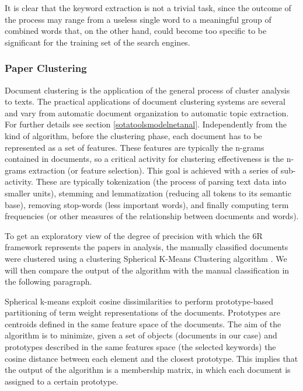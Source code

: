 \documentclass[]{book}
\begin{document}
It is clear that the keyword extraction is not a trivial task, since the
outcome of the process may range from a useless single word to a
meaningful group of combined words that, on the other hand, could become
too specific to be significant for the training set of the search
engines.

\subsubsection*{Paper Clustering}\label{paper-clustering}

Document clustering is the application of the general process of cluster
analysis to texts. The practical applications of document clustering
systems are several and vary from automatic document organization to
automatic topic extraction. For further details see section
\ref{sotatoolsmodelnetanal}. Independently from the kind of algorithm,
before the clustering phase, each document has to be represented as a
set of features. These features are typically the n-grams contained in
documents, so a critical activity for clustering effectiveness is the
n-grams extraction (or feature selection). This goal is achieved with a
series of sub-activity. These are typically tokenization (the process of
parsing text data into smaller units), stemming and lemmatization
(reducing all tokens to its semantic base), removing stop-words (less
important words), and finally computing term frequencies (or other
measures of the relationship between documents and words).

To get an exploratory view of the degree of precision with which the 6R
framework represents the papers in analysis, the manually classified
documents were clustered using a clustering Spherical K-Means Clustering
algorithm \citep{buchta2012spherical}. We will then compare the output
of the algorithm with the manual classification in the following
paragraph.

Spherical k-means exploit cosine dissimilarities to perform
prototype-based partitioning of term weight representations of the
documents. Prototypes are centroids defined in the same feature space of
the documents. The aim of the algorithm is to minimize, given a set of
objects (documents in our case) and prototypes described in the same
features space (the selected keywords) the cosine distance between each
element and the closest prototype. This implies that the output of the
algorithm is a membership matrix, in which each document is assigned to
a certain prototype.
\end{document}
